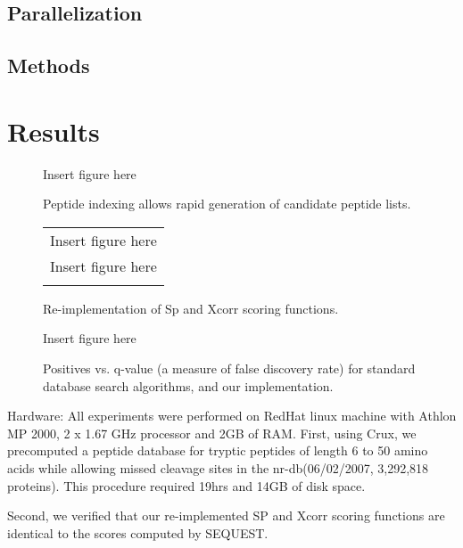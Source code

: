 \documentclass{bioinfo}
\begin{document}
\subsection{Parallelization}

\begin{methods}
\section{Methods}

\end{methods}

\section{Results}

\begin{figure}
  \centering
  Insert figure here
  \caption{Peptide indexing allows rapid generation of candidate peptide
  lists.}
  \label{figure:indexing}
\end{figure}

\begin{figure}
  \centering
  \begin{tabular}{c}
  Insert figure here \\
  Insert figure here \\
  \caption{Re-implementation of Sp and Xcorr scoring functions.}
  \label{figure:indexing}
  \end{tabular}
\end{figure}

\begin{figure}
  \centering
  Insert figure here
  \caption{Positives vs. q-value (a measure of false discovery rate) for
  standard database search algorithms, and our implementation.}
  \label{figure:indexing}
\end{figure}

Hardware: All experiments were performed on RedHat linux machine with
Athlon MP 2000, 2 x 1.67 GHz processor and 2GB of RAM.  First, using
Crux, we precomputed a peptide database for tryptic peptides of length
6 to 50 amino acids while allowing missed cleavage sites in the
nr-db(06/02/2007, 3,292,818 proteins). This procedure required 19hrs
and 14GB of disk space.

Second, we verified that our re-implemented SP and Xcorr scoring
functions are identical to the scores computed by SEQUEST.
\end{document}
